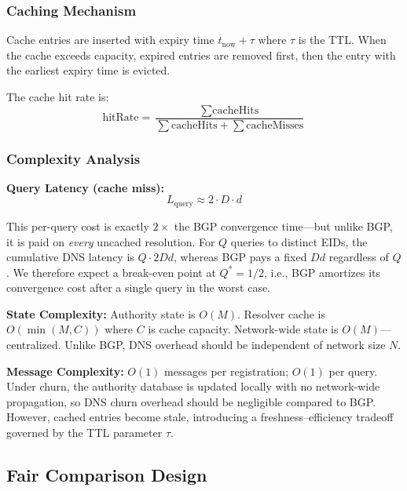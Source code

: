 \documentclass[journal,twocolumn]{IEEEtran}
\begin{document}
\subsubsection{Caching Mechanism}

Cache entries are inserted with expiry time $t_{\text{now}} + \tau$ where $\tau$ is the TTL. 
When the cache exceeds capacity, expired entries are removed first, then the entry with the earliest expiry time is evicted.

The cache hit rate is:
\begin{equation}
\text{hitRate} = \frac{\sum \text{cacheHits}}{\sum \text{cacheHits} + \sum \text{cacheMisses}}
\end{equation}

\subsubsection{Complexity Analysis}

\textbf{Query Latency (cache miss):}
\begin{equation}
L_{\text{query}} \approx 2 \cdot D \cdot d
\end{equation}

This per-query cost is exactly $2\times$ the BGP convergence time---but unlike BGP, it is paid on \emph{every} uncached resolution. 
For $Q$ queries to distinct EIDs, the cumulative DNS latency is $Q \cdot 2Dd$, whereas BGP pays a fixed $Dd$ regardless of $Q$. 
We therefore expect a break-even point at $Q^* = 1/2$, i.e., BGP amortizes its convergence cost after a single query in the worst case.

\textbf{State Complexity:} Authority state is $O(M)$. Resolver cache is $O(\min(M, C))$ where $C$ is cache capacity. 
Network-wide state is $O(M)$---centralized. 
Unlike BGP, DNS overhead should be independent of network size $N$.

\textbf{Message Complexity:} $O(1)$ messages per registration; $O(1)$ per query. 
Under churn, the authority database is updated locally with no network-wide propagation, so DNS churn overhead should be negligible compared to BGP. 
However, cached entries become stale, introducing a freshness--efficiency tradeoff governed by the TTL parameter $\tau$.

\subsection{Fair Comparison Design}
\label{sec_fair_comparison}
\end{document}
